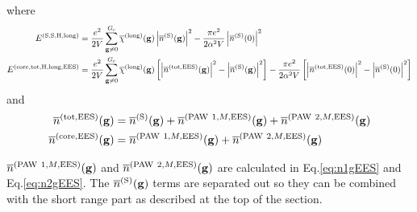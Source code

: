 \documentclass[paper=a4, fontsize=11pt]{article} %
\numberwithin{equation}{section} %
\numberwithin{figure}{section} %
\numberwithin{table}{section} %
\newcommand{\ol}{\overline}
\newcommand{\bg}{{\bf{g}}}
\newcommand{\rS}{{\mathrm{S}}}
\newcommand{\rEES}{{\mathrm{EES}}}
\newcommand{\rcore}{{\mathrm{core}}}
\newcommand{\rlong}{{\mathrm{long}}}
\newcommand{\rP}{{\mathrm{PAW}}}
\newcommand{\rH}{{\mathrm{H}}}
\newcommand{\rtot}{{\mathrm{tot}}}
\newcommand{\Gc}{{G_{\mathrm{c}}}}
\begin{document}
where 
\begin{equation}
\begin{split}
E^{(\rS,\rS,\rH,\rlong)}&= \frac{e^2}{2V} \sum_{\bg \neq 0}^\Gc \ol \chi^{(\rlong)} (\bg)\left|\ol{n}^{(\rS)}(\bg)\right|^2- \frac{\pi e^2}{2\alpha^2 V}\left|\overline{n}^{(\rS)}(0)\right|^2 \\
E^{(\rcore,\rtot,\rH,\rlong,\rEES)}&= \frac{e^2}{2V} \sum_{\bg \neq 0}^\Gc \ol \chi^{(\rlong)} (\bg)\left[\left|\ol{n}^{(\rtot,\rEES)}(\bg)\right|^2 -  \left|\ol{n}^{(\rS)}(\bg)\right|^2\right]- \frac{\pi e^2}{2\alpha^2 V}\left[\left|\ol {n}^{(\rtot,\rEES)}(0)\right|^2 - \left|\ol {n}^{(\rS)}(0)\right|^2\right]\\
\end{split}
\end{equation}
and
\begin{equation}
\begin{split}
\ol{n}^{(\rtot,\rEES)}(\bg) &= \ol n^{(\rS)}(\bg) + \ol n^{(\rP\ 1,M,\rEES)}(\bg)+\ol n^{(\rP\ 2,M,\rEES)}(\bg)\\
\ol{n}^{(\rcore,\rEES)}(\bg) &= \ol n^{(\rP\ 1,M,\rEES)}(\bg)+\ol n^{(\rP\ 2,M,\rEES)}(\bg)\\
\end{split}
\end{equation}

$\ol n^{(\rP\ 1,M,\rEES)}(\bg)$ and $\ol n^{(\rP\ 2,M,\rEES)}(\bg)$ are calculated in Eq.\eqref{eq:n1gEES} and Eq.\eqref{eq:n2gEES}. The $\ol n^{(\rS)}(\bg)$ terms are separated out so they can be combined with the short range part as described at the top of the section.\\
\end{document}
